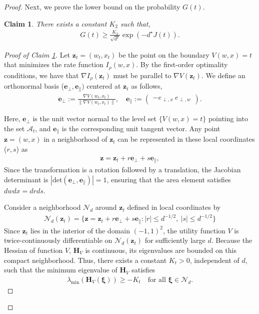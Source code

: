 \documentclass[12pt]{article}
\newtheorem{claim}[theorem]{Claim}
\theoremstyle{definition}
\theoremstyle{remark}
\begin{document}
\begin{proof}
Next, we prove the lower bound on the probability $G(t)$.
\begin{claim}
\label{claim:g_lower_bound}
There exists a constant $K_2$ such that,
\begin{align*}
    G(t) \geq \frac{K_2}{\sqrt{d^\star}} \exp\left(-d^{\star} J(t)\right).
\end{align*}
\end{claim}

\begin{proof}[Proof of Claim \ref{claim:g_lower_bound}]
Let $\mathbf{z}_t = (w_t, x_t)$ be the point on the boundary $V(w,x) =t$ that minimizes the rate function $I_\rho(w,x)$. By the first-order optimality conditions, we have that $\nabla I_\rho(\mathbf{z}_t)$ must be parallel to $\nabla V(\mathbf{z}_t)$. We define an orthonormal basis ($\mathbf{e}_{\perp}, \mathbf{e}_{\parallel})$ centered at $\mathbf{z}_t$ as follows,
\begin{align}
\mathbf{e}_{\perp} := \frac{\nabla V(w_t, x_t)}{\|\nabla V(w_t, x_t)\|}, \quad \mathbf{e}_{\parallel} := \begin{pmatrix} -e_{\perp, x} \ e_{\perp, w} \end{pmatrix}.
\end{align}

Here, $\mathbf{e}_{\perp}$ is the unit vector normal to the level set $\{V(w,x) = t\}$ pointing into the set $\mathcal{A}_t$, and $\mathbf{e}_{\parallel}$ is the corresponding unit tangent vector. Any point $\mathbf{z}= (w,x)$ in a neighborhood of $\mathbf{z}_t$ can be represented in these local coordinates ($r,s$) as
\begin{align}
\mathbf{z} = \mathbf{z}_t + r \mathbf{e}_{\perp} + s \mathbf{e}_{\parallel},
\end{align}
Since the transformation is a rotation followed by a translation, the Jacobian determinant is $|\text{det}(\mathbf{e}_{\perp}, \mathbf{e}_{\parallel})| = 1$, ensuring that the area element satisfies $dw dx = dr ds$.

Consider a neighborhood $\mathcal{N}_d$ around $\mathbf{z}_t$ defined in local coordinates by
\begin{align*}
  \mathcal{N}_d(\mathbf{z}_t) = \big\{ \mathbf{z} = \mathbf{z}_t + r \mathbf{e}_{\perp} + s \mathbf{e}_{\parallel} : |r| \leq d^{-1/2}, \ |s| \leq d^{-1/2} \big\}
\end{align*}
Since $\mathbf{z}_t$ lies in the interior of the domain $(-1, 1)^2$, the utility function $V$ is twice-continuously differentiable on $\mathcal{N}_d(\mathbf{z}_t)$ for sufficiently large $d$. Because the Hessian of function $V$, $\mathbf{H}_V$ is continuous, its eigenvalues are bounded on this compact neighborhood. Thus, there exists a constant $K_t > 0$, independent of $d$, such that the minimum eigenvalue of $\mathbf{H}_V$ satisfies
\begin{align*}
    \lambda_{\min}(\mathbf{H}_V(\boldsymbol{\xi})) \geq -K_t \quad \text{for all } \boldsymbol{\xi} \in \mathcal{N}_d.
\end{align*}


\end{proof}
\end{proof}
\end{document}
